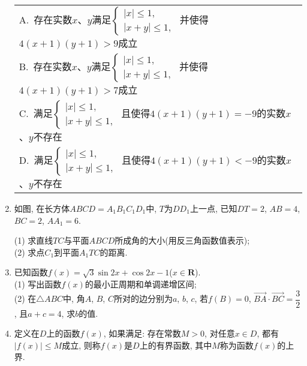 \documentclass[10pt,a4paper]{article}
\newcommand{\onech}[4]{\par\begin{tabular}{p{.9\textwidth}}
A.~#1\\
B.~#2\\
C.~#3\\
D.~#4
\end{tabular}}
\begin{document}
\begin{enumerate}[1.]
\onech{存在实数$x$、$y$满足$\begin{cases}|x|\le 1, \\|x+y|\le 1, \end{cases}$ 并使得$4(x+1)(y+1)>9$成立}{存在实数$x$、$y$满足$\begin{cases}|x|\le 1, \\|x+y|\le 1, \end{cases}$ 并使得$4(x+1)(y+1)>7$成立}{满足$\begin{cases}|x|\le 1, \\|x+y|\le 1, \end{cases}$ 且使得$4(x+1)(y+1)=-9$的实数$x$、$y$不存在}{满足$\begin{cases}|x|\le 1, \\|x+y|\le 1, \end{cases}$ 且使得$4(x+1)(y+1)<-9$的实数$x$、$y$不存在}
\item 如图, 在长方体$ABCD=A_1B_1C_1D_1$中, $T$为$DD_1$上一点, 已知$DT=2$, $AB=4$, $BC=2$, $AA_1=6$.
\begin{center}
\end{center}
(1) 求直线$TC$与平面$ABCD$所成角的大小(用反三角函数值表示);\\
(2) 求点$C_1$到平面$A_1TC$的距离.
\item 已知函数$f(x)=\sqrt 3\sin 2x+\cos 2x-1$($x\in \mathbf{R}$).\\
(1) 写出函数$f(x)$的最小正周期和单调递增区间;\\
(2) 在$\triangle ABC$中, 角$A$, $B$, $C$所对的边分别为$a$, $b$, $c$, 若$f(B)=0$, $\overrightarrow{BA}\cdot \overrightarrow{BC}=\dfrac 32$, 且$a+c=4$, 求$b$的值.
\item 定义在$D$上的函数$f(x)$, 如果满足: 存在常数$M>0$, 对任意$x\in D$, 都有$|f(x)|\le M$成立, 则称$f(x)$是$D$上的有界函数, 其中$M$称为函数$f(x)$的上界.\\

\end{enumerate}
\end{document}
